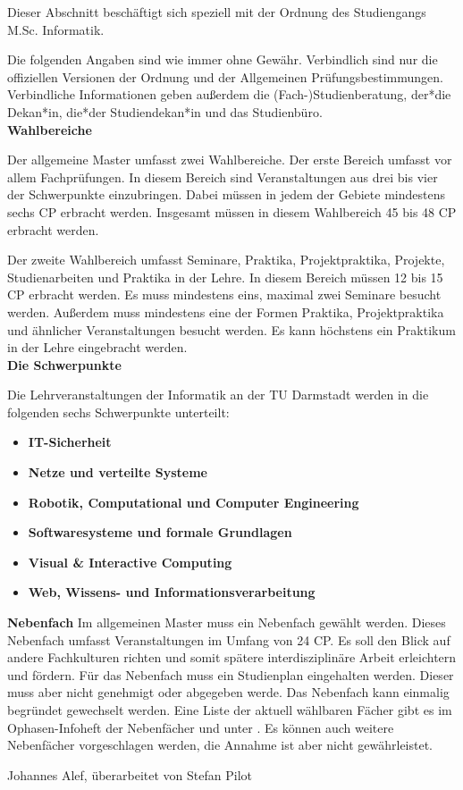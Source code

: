 {Dieser Abschnitt beschäftigt sich speziell mit der Ordnung des Studiengangs M.Sc. Informatik.
}{
    Die folgenden Angaben sind wie immer ohne Gewähr. Verbindlich sind nur die offiziellen Versionen der Ordnung und der Allgemeinen Prüfungsbestimmungen. Verbindliche Informationen geben außerdem die (Fach-)Studienberatung, der*die Dekan*in, die*der Studiendekan*in und das Studienbüro.\\

    \noindent\textbf{Wahlbereiche}

    Der allgemeine Master umfasst zwei Wahlbereiche. Der erste Bereich umfasst vor allem Fachprüfungen. In diesem Bereich sind Veranstaltungen aus drei bis vier der Schwerpunkte einzubringen. Dabei müssen in jedem der Gebiete mindestens sechs CP erbracht werden. Insgesamt müssen in diesem Wahlbereich 45 bis 48 CP erbracht werden.

    Der zweite Wahlbereich umfasst Seminare, Praktika, Projektpraktika, Projekte, Studienarbeiten und Praktika in der Lehre. In diesem Bereich müssen 12 bis 15 CP erbracht werden. Es muss mindestens eins, maximal zwei Seminare besucht werden. Außerdem muss mindestens eine der Formen Praktika, Projektpraktika und ähnlicher Veranstaltungen besucht werden. Es kann höchstens ein Praktikum in der Lehre eingebracht werden.\\

    \columnbreak
    \noindent\textbf{Die Schwerpunkte}

    Die Lehrveranstaltungen der Informatik an der TU Darmstadt werden in die folgenden sechs Schwerpunkte unterteilt:
    \begin{itemize}
        \item \textbf{IT-Sicherheit}
        \item \textbf{Netze und verteilte Systeme}
        \item \textbf{Robotik, Computational und Computer Engineering}
        \item \textbf{Softwaresysteme und formale Grundlagen}
        \item \textbf{Visual \& Interactive Computing}
        \item \textbf{Web, Wissens- und Informationsverarbeitung}
    \end{itemize}

    \noindent\textbf{Nebenfach}
    Im allgemeinen Master muss ein Nebenfach gewählt werden. Dieses Nebenfach umfasst Veranstaltungen im Umfang von 24 CP. Es soll den Blick auf andere Fachkulturen richten und somit spätere interdisziplinäre Arbeit erleichtern und fördern. Für das Nebenfach muss ein Studienplan eingehalten werden. Dieser muss aber nicht genehmigt oder abgegeben werde. Das Nebenfach kann einmalig begründet gewechselt werden. Eine Liste der aktuell wählbaren Fächer gibt es im Ophasen-Infoheft der Nebenfächer und unter \footnotemark[2]. Es können auch weitere Nebenfächer vorgeschlagen werden, die Annahme ist aber nicht gewährleistet.\\
}
{Johannes Alef, überarbeitet von Stefan Pilot}

